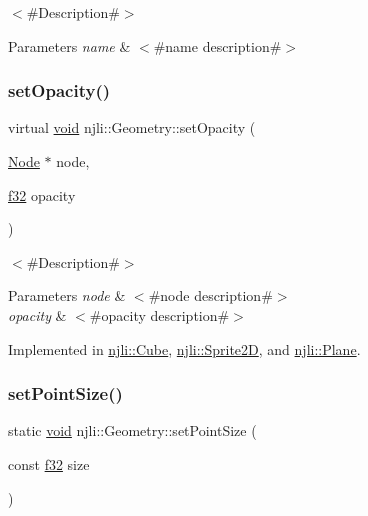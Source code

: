 $<$\#\+Description\#$>$


\begin{DoxyParams}{Parameters}
{\em name} & $<$\#name description\#$>$ \\
\hline
\end{DoxyParams}
\mbox{\label{classnjli_1_1_geometry_ad4f8c2a3b873a63ee62c87d512b9540d}} 
\subsubsection{\texorpdfstring{set\+Opacity()}{setOpacity()}}
{\footnotesize\ttfamily virtual \mbox{\hyperlink{_thread_8h_af1e856da2e658414cb2456cb6f7ebc66}{void}} njli\+::\+Geometry\+::set\+Opacity (\begin{DoxyParamCaption}\item[{\mbox{\hyperlink{classnjli_1_1_node}{Node}} $\ast$}]{node,  }\item[{\mbox{\hyperlink{_util_8h_a5f6906312a689f27d70e9d086649d3fd}{f32}}}]{opacity }\end{DoxyParamCaption})\hspace{0.3cm}{\ttfamily [pure virtual]}}

$<$\#\+Description\#$>$


\begin{DoxyParams}{Parameters}
{\em node} & $<$\#node description\#$>$ \\
\hline
{\em opacity} & $<$\#opacity description\#$>$ \\
\hline
\end{DoxyParams}


Implemented in \mbox{\hyperlink{classnjli_1_1_cube_a490650f1d2fc6296bc867229367975b8}{njli\+::\+Cube}}, \mbox{\hyperlink{classnjli_1_1_sprite2_d_abf2ee9acb5cd301b5a4029181be7b155}{njli\+::\+Sprite2D}}, and \mbox{\hyperlink{classnjli_1_1_plane_abf634e87fdc57ec8a9a2965ec24cc34f}{njli\+::\+Plane}}.

\mbox{\label{classnjli_1_1_geometry_a73ef5b46355f011df4a64303dd99d7b6}} 
\subsubsection{\texorpdfstring{set\+Point\+Size()}{setPointSize()}}
{\footnotesize\ttfamily static \mbox{\hyperlink{_thread_8h_af1e856da2e658414cb2456cb6f7ebc66}{void}} njli\+::\+Geometry\+::set\+Point\+Size (\begin{DoxyParamCaption}\item[{const \mbox{\hyperlink{_util_8h_a5f6906312a689f27d70e9d086649d3fd}{f32}}}]{size }\end{DoxyParamCaption})\hspace{0.3cm}{\ttfamily [static]}}

